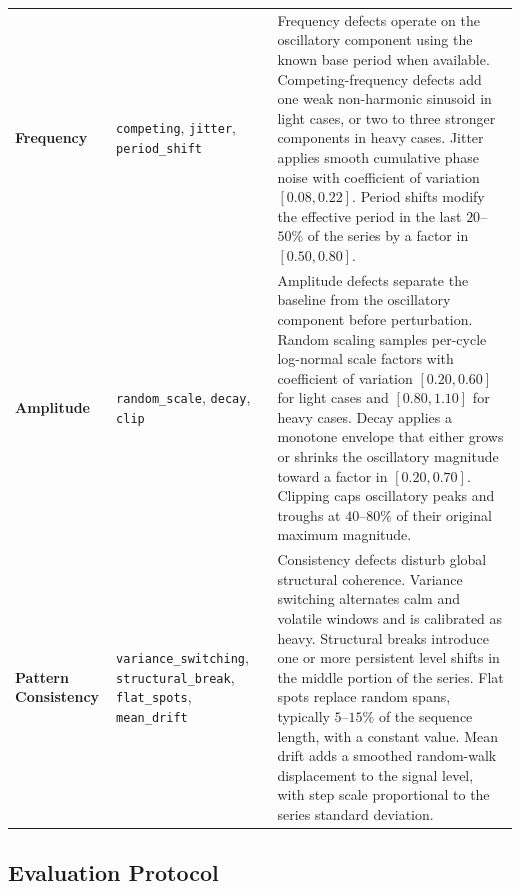 \documentclass{article}
\begin{document}
\begin{table}[!htbp]
\begin{tabular}{>{\raggedright\arraybackslash}p{2.05cm}
                >{\raggedright\arraybackslash}p{3.25cm}
                >{\raggedright\arraybackslash}p{7.35cm}}
\textbf{Frequency}
& \texttt{competing}, \texttt{jitter}, \texttt{period\_shift}
& Frequency defects operate on the oscillatory component using the known base period when available. Competing-frequency defects add one weak non-harmonic sinusoid in light cases, or two to three stronger components in heavy cases. Jitter applies smooth cumulative phase noise with coefficient of variation $[0.08,0.22]$. Period shifts modify the effective period in the last $20$--$50\%$ of the series by a factor in $[0.50,0.80]$. \\
\textbf{Amplitude}
& \texttt{random\_scale}, \texttt{decay}, \texttt{clip}
& Amplitude defects separate the baseline from the oscillatory component before perturbation. Random scaling samples per-cycle log-normal scale factors with coefficient of variation $[0.20,0.60]$ for light cases and $[0.80,1.10]$ for heavy cases. Decay applies a monotone envelope that either grows or shrinks the oscillatory magnitude toward a factor in $[0.20,0.70]$. Clipping caps oscillatory peaks and troughs at $40$--$80\%$ of their original maximum magnitude. \\
\textbf{Pattern Consistency}
& \texttt{variance\_switching}, \texttt{structural\_break}, \texttt{flat\_spots}, \texttt{mean\_drift}
& Consistency defects disturb global structural coherence. Variance switching alternates calm and volatile windows and is calibrated as heavy. Structural breaks introduce one or more persistent level shifts in the middle portion of the series. Flat spots replace random spans, typically $5$--$15\%$ of the sequence length, with a constant value. Mean drift adds a smoothed random-walk displacement to the signal level, with step scale proportional to the series standard deviation. \\
\bottomrule
\end{tabular}
\label{tab:defect_semantics}
\end{table}

\subsection{Evaluation Protocol}
\end{document}
